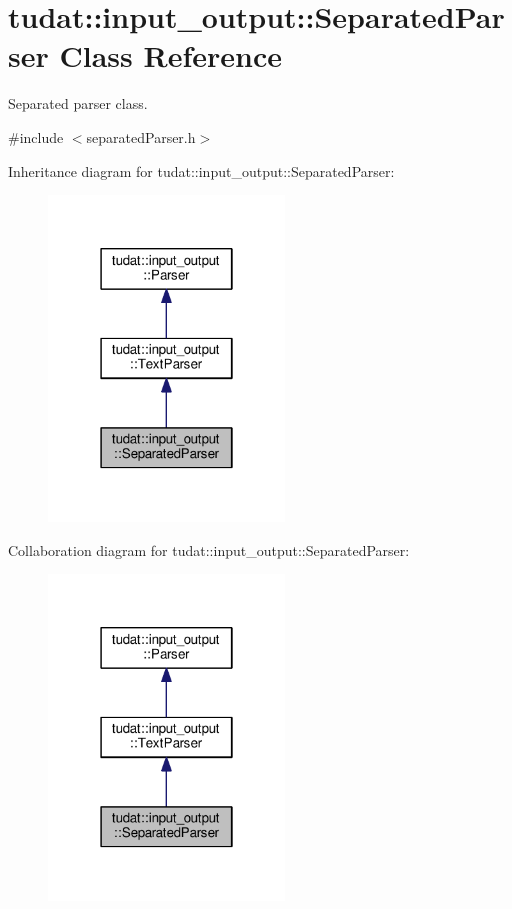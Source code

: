 \hypertarget{classtudat_1_1input__output_1_1SeparatedParser}{}\section{tudat\+:\+:input\+\_\+output\+:\+:Separated\+Parser Class Reference}
\label{classtudat_1_1input__output_1_1SeparatedParser}


Separated parser class.  




{\ttfamily \#include $<$separated\+Parser.\+h$>$}



Inheritance diagram for tudat\+:\+:input\+\_\+output\+:\+:Separated\+Parser\+:
\nopagebreak
\begin{figure}[H]
\begin{center}
\leavevmode
\includegraphics[width=178pt]{classtudat_1_1input__output_1_1SeparatedParser__inherit__graph}
\end{center}
\end{figure}


Collaboration diagram for tudat\+:\+:input\+\_\+output\+:\+:Separated\+Parser\+:
\nopagebreak
\begin{figure}[H]
\begin{center}
\leavevmode
\includegraphics[width=178pt]{classtudat_1_1input__output_1_1SeparatedParser__coll__graph}
\end{center}
\end{figure}
